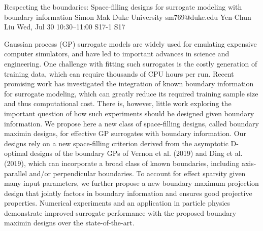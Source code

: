 \begin{talk}
  {Respecting the boundaries: Space-filling designs for surrogate modeling with boundary information}%
  {Simon Mak}%
  {Duke University}%
  {sm769@duke.edu}%
  {Yen-Chun Liu}%
  {}%
  {Wed, Jul 30 10:30--11:00}%
  {S17-1}%
  {S17}%
  
    
   
Gaussian process (GP) surrogate models are widely used for emulating expensive computer simulators, and have led to important advances in science and engineering. One challenge with fitting such surrogates is the costly generation of training data, which can require thousands of CPU hours per run. Recent promising work has investigated the integration of known boundary information for surrogate modeling, which can greatly reduce its required training sample size and thus computational cost. There is, however, little work exploring the important question of how such experiments should be designed given boundary information. We propose here a new class of space-filling designs, called boundary maximin designs, for effective GP surrogates with boundary information. Our designs rely on a new space-filling criterion derived from the asymptotic D-optimal designs of the boundary GPs of Vernon et al. (2019) and Ding et al. (2019), which can incorporate a broad class of known boundaries, including axis-parallel and/or perpendicular boundaries. To account for effect sparsity given many input parameters, we further propose a new boundary maximum projection design that jointly factors in boundary information and ensures good projective properties. Numerical experiments and an application in particle physics demonstrate improved surrogate performance with the proposed boundary maximin designs over the state-of-the-art.
\medskip


\end{talk}

